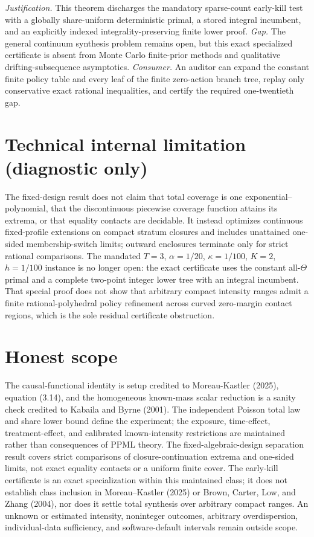 \documentclass{article}
\begin{document}
\par\smallskip\noindent \textit{Justification.} This theorem discharges the mandatory sparse-count early-kill test with a globally share-uniform deterministic primal, a stored integral incumbent, and an explicitly indexed integrality-preserving finite lower proof. \textit{Gap.} The general continuum synthesis problem remains open, but this exact specialized certificate is absent from Monte Carlo finite-prior methods and qualitative drifting-subsequence asymptotics. \textit{Consumer.} An auditor can expand the constant finite policy table and every leaf of the finite zero-action branch tree, replay only conservative exact rational inequalities, and certify the required one-twentieth gap.

\section*{Technical internal limitation (diagnostic only)}

The fixed-design result does not claim that total coverage is one exponential--polynomial, that the discontinuous piecewise coverage function attains its extrema, or that equality contacts are decidable. It instead optimizes continuous fixed-profile extensions on compact stratum closures and includes unattained one-sided membership-switch limits; outward enclosures terminate only for strict rational comparisons. The mandated \(T=3\), \(\alpha=1/20\), \(\kappa=1/100\), \(K=2\), \(h=1/100\) instance is no longer open: the exact certificate uses the constant all-\(\Theta\) primal and a complete two-point integer lower tree with an integral incumbent. That special proof does not show that arbitrary compact intensity ranges admit a finite rational-polyhedral policy refinement across curved zero-margin contact regions, which is the sole residual certificate obstruction.

\section{Honest scope}

The causal-functional identity is setup credited to Moreau-Kastler (2025), equation (3.14), and the homogeneous known-mass scalar reduction is a sanity check credited to Kabaila and Byrne (2001). The independent Poisson total law and share lower bound define the experiment; the exposure, time-effect, treatment-effect, and calibrated known-intensity restrictions are maintained rather than consequences of PPML theory. The fixed-algebraic-design separation result covers strict comparisons of closure-continuation extrema and one-sided limits, not exact equality contacts or a uniform finite cover. The early-kill certificate is an exact specialization within this maintained class; it does not establish class inclusion in Moreau--Kastler (2025) or Brown, Carter, Low, and Zhang (2004), nor does it settle total synthesis over arbitrary compact ranges. An unknown or estimated intensity, noninteger outcomes, arbitrary overdispersion, individual-data sufficiency, and software-default intervals remain outside scope.
\end{document}
